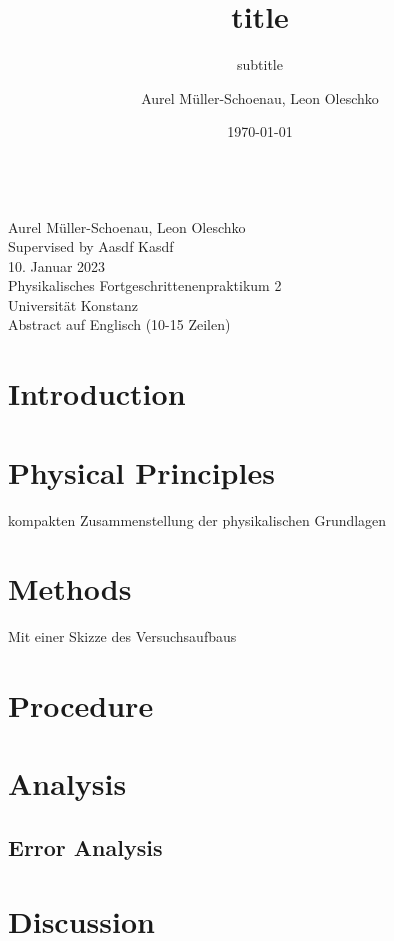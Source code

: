 \documentclass[
    parskip=half, 
    twoside=false,
    twocolumn=true
]{scrarticle}
\begin{document}
\title{title}
\subtitle{subtitle}
\author{Aurel Müller-Schoenau, Leon Oleschko}
\date{\dotdate\today}


\begin{titlepage}
    \sffamily

    \vspace*{3cm}
    {
        \fontsize{32}{32}
    }
    \vspace{.25cm}\\
    {
        \Large
        Aurel Müller-Schoenau, Leon Oleschko\\
        Supervised by Aasdf Kasdf
        \vspace{.05cm}\\
        10. Januar 2023
        \vspace{.25cm}\\
        \normalsize
        Physikalisches Fortgeschrittenenpraktikum 2\\
        Universität Konstanz
    }
    \vspace{3cm}\\
    {
        Abstract auf Englisch (10-15 Zeilen)
        \blindtext[2]
    }
\end{titlepage}


\section{Introduction}
\blindtext

\section{Physical Principles}
kompakten Zusammenstellung der physikalischen Grundlagen
\blindtext

\section{Methods}
Mit einer Skizze des Versuchsaufbaus
\blindtext[3]

\pagebreak
\section{Procedure}
\blindtext[5]

\pagebreak
\section{Analysis}
\blindtext

\subsection{Error Analysis}
\blindtext

\pagebreak
\section{Discussion}
\blindtext
\end{document}
